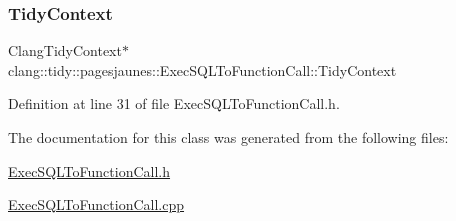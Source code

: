 \subsubsection{\texorpdfstring{Tidy\+Context}{TidyContext}}
{\footnotesize\ttfamily Clang\+Tidy\+Context$\ast$ clang\+::tidy\+::pagesjaunes\+::\+Exec\+S\+Q\+L\+To\+Function\+Call\+::\+Tidy\+Context}



Definition at line 31 of file Exec\+S\+Q\+L\+To\+Function\+Call.\+h.



The documentation for this class was generated from the following files\+:\begin{DoxyCompactItemize}
\item 
\hyperlink{_exec_s_q_l_to_function_call_8h}{Exec\+S\+Q\+L\+To\+Function\+Call.\+h}\item 
\hyperlink{_exec_s_q_l_to_function_call_8cpp}{Exec\+S\+Q\+L\+To\+Function\+Call.\+cpp}\end{DoxyCompactItemize}
